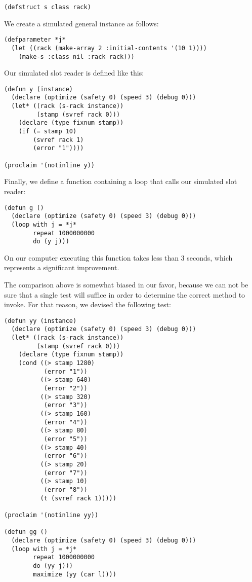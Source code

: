\begin{verbatim}
(defstruct s class rack)
\end{verbatim}

We create a simulated general instance as follows:

\begin{verbatim}
(defparameter *j* 
  (let ((rack (make-array 2 :initial-contents '(10 1))))
    (make-s :class nil :rack rack)))
\end{verbatim}

Our simulated slot reader is defined like this:

\begin{verbatim}
(defun y (instance)
  (declare (optimize (safety 0) (speed 3) (debug 0)))
  (let* ((rack (s-rack instance))
         (stamp (svref rack 0)))
    (declare (type fixnum stamp))
    (if (= stamp 10)
        (svref rack 1)
        (error "1"))))

(proclaim '(notinline y))
\end{verbatim}

Finally, we define a function containing a loop that calls our
simulated slot reader:

\begin{verbatim}
(defun g ()
  (declare (optimize (safety 0) (speed 3) (debug 0)))
  (loop with j = *j*
        repeat 1000000000
        do (y j)))
\end{verbatim}

On our computer executing this function takes less than $3$ seconds,
which represents a significant improvement.

The comparison above is somewhat biased in our favor, because we can
not be sure that a single test will suffice in order to determine the
correct method to invoke.  For that reason, we devised the following
test: 

\begin{verbatim}
(defun yy (instance)
  (declare (optimize (safety 0) (speed 3) (debug 0)))
  (let* ((rack (s-rack instance))
         (stamp (svref rack 0)))
    (declare (type fixnum stamp))
    (cond ((> stamp 1280)
           (error "1"))
          ((> stamp 640)
           (error "2"))
          ((> stamp 320)
           (error "3"))
          ((> stamp 160)
           (error "4"))
          ((> stamp 80)
           (error "5"))
          ((> stamp 40)
           (error "6"))
          ((> stamp 20)
           (error "7"))
          ((> stamp 10)
           (error "8"))
          (t (svref rack 1)))))

(proclaim '(notinline yy))

(defun gg ()
  (declare (optimize (safety 0) (speed 3) (debug 0)))
  (loop with j = *j*
        repeat 1000000000
        do (yy j)))
        maximize (yy (car l))))
\end{verbatim}

